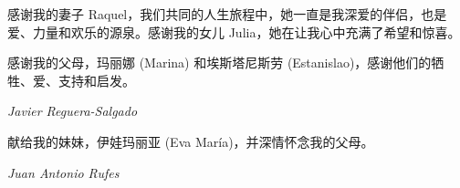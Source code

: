 

感谢我的妻子 Raquel，我们共同的人生旅程中，她一直是我深爱的伴侣，也是爱、力量和欢乐的源泉。感谢我的女儿 Julia，她在让我心中充满了希望和惊喜。

感谢我的父母，玛丽娜 (Marina) 和埃斯塔尼斯劳 (Estanislao)，感谢他们的牺牲、爱、支持和启发。

\begin{flushright}
\textit{Javier Reguera-Salgado}
\end{flushright}

献给我的妹妹，伊娃玛丽亚 (Eva María)，并深情怀念我的父母。

\begin{flushright}
\textit{Juan Antonio Rufes}
\end{flushright}